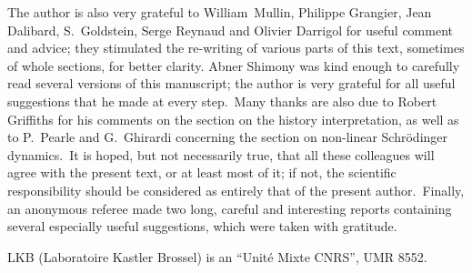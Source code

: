 \documentclass[12pt,onecolumn]{article}%
\begin{document}
The author is also very grateful to William\ Mullin, Philippe Grangier, Jean
Dalibard, S.\ Goldstein, Serge Reynaud and Olivier Darrigol for useful comment
and advice; they stimulated the re-writing of various parts of this text,
sometimes of whole sections, for better clarity. Abner Shimony was kind enough
to carefully read several versions of this manuscript; the author is very
grateful for all useful suggestions that he made at every step.\ Many thanks
are also due to Robert Griffiths for his comments on the section on the
history interpretation, as well as to P.\ Pearle and G.\ Ghirardi concerning
the section on non-linear Schr\"{o}dinger dynamics.\ It is hoped, but not
necessarily true, that all these colleagues will agree with the present text,
or at least most of it; if not, the scientific responsibility should be
considered as entirely that of the present author.\ Finally, an anonymous
referee made two long, careful and interesting reports containing several
especially useful suggestions, which were taken with gratitude.

LKB (Laboratoire Kastler Brossel) is an ``Unit\'{e} Mixte CNRS'', UMR 8552.

\bigskip
\end{document}
